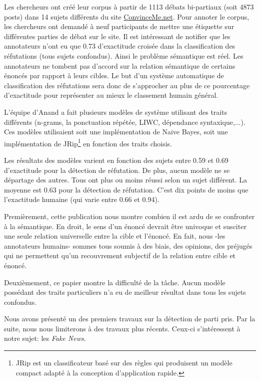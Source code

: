 \documentclass[11pt,a4paper,oldfontcommands]{memoir}
\begin{document}
Les chercheurs ont créé leur corpus à partir de 1113 débats bi-partiaux (soit 4873 posts) dans 14 sujets différents du site \href{http://www.convinceme.net/}{ConvinceMe.net}.
Pour annoter le corpus, les chercheurs ont demandé à neuf participants de mettre une étiquette sur différentes parties de débat sur le site.
Il est intéressant de notifier que les annotateurs  n'ont eu que 0.73 d'exactitude croisée dans la classification des réfutations (tous sujets confondus).
Ainsi le problème sémantique est réel.
Les annotateurs ne tombent pas d'accord sur la relation sémantique de certains énoncés par rapport à leurs cibles.
Le but d'un système automatique de classification des réfutations sera donc de s'approcher au plus de ce pourcentage d'exactitude pour représenter au mieux le classement humain général.

L'équipe d'Anand a fait plusieurs modèles de système utilisant des traits différents (n-grams, la ponctuation répétée, LIWC, dépendance syntaxique,...).
Ces modèles utilisaient soit une implémentation de Naive Bayes, soit une implémentation de JRip\footnote{JRip est un classificateur basé sur des règles qui produisent un modèle compact adapté à la conception d'application rapide.} en fonction des traits choisis.

Les résultats des modèles varient en fonction des sujets entre 0.59 et 0.69 d'exactitude pour la détection de réfutation.
De plus, aucun modèle ne se départage des autres.
Tous ont plus ou moins réussi selon un sujet différent.
La moyenne est 0.63 pour la détection de réfutation.
C'est dix points de moins que l'exactitude humaine (qui varie entre 0.66 et 0.94).

Premièrement, cette publication nous montre combien il est ardu de se confronter à la sémantique.
En droit, le sens d'un énoncé devrait être univoque et susciter une seule relation universelle entre la cible et l'énoncé.
En fait, nous -les annotateurs humains- sommes tous soumis à des biais, des opinions, des préjugés qui ne permettent qu'un recouvrement subjectif de la relation entre cible et énoncé.

Deuxièmement, ce papier montre la difficulté de la tâche.
Aucun modèle possédant des traits particuliers n'a eu de meilleur résultat dans tous les sujets confondus.

Nous avons présenté un des premiers travaux sur la détection de parti pris.
Par la suite, nous nous limiterons à des travaux plus récents.
Ceux-ci s'intéressent à notre sujet: les \textit{Fake News}.
\end{document}
